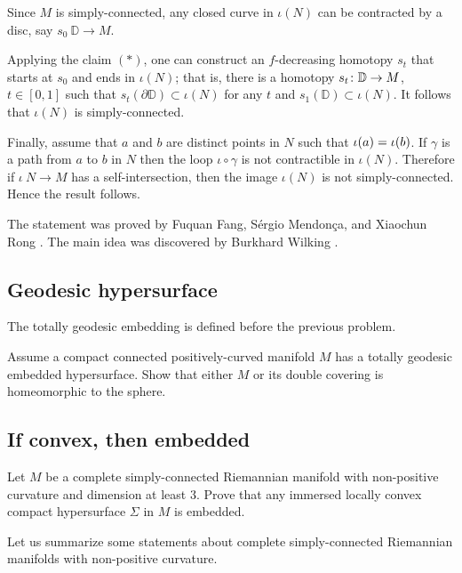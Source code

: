 Since $M$ is simply-connected,
any closed curve in $\iota(N)$
can be contracted by a disc, say $s_0\:\mathbb D\to M$.

Applying the claim $({*})$, one can construct an $f$-decreasing homotopy $s_t$ that starts at $s_0$ and ends in $\iota(N)$;
that is, there is 
a homotopy $s_t\:\mathbb D\z\to M$, $t\in [0,1]$ 
such that $s_t(\partial \mathbb D)\subset \iota(N)$ for any $t$ 
and $s_1(\mathbb D)\subset \iota(N)$.
It follows that $\iota(N)$ is simply-connected.

Finally, assume that $a$ and $b$ are distinct points in $N$ such that $\iota(a)\z=\iota(b)$.
If $\gamma$ is a path from $a$ to $b$ in $N$ then the loop $\iota\circ\gamma$ is not contractible in $\iota(N)$.
Therefore if $\iota\:N\to M$ has a self-intersection,
then the image
$\iota(N)$ is not simply-connected.
Hence the result follows.\qeds


The statement was proved by 
Fuquan Fang, 
S\'ergio Mendon\c{c}a,
and Xiaochun Rong \cite{FMR}.
The main idea was discovered by 
Burkhard Wilking \cite{wilking-2003}.

\subsection*{Geodesic hypersurface}
\label{Geodesic hypersurface}

The totally geodesic embedding is defined before the previous problem.

\begin{pr}
Assume a compact connected positively-curved manifold $M$ has a totally geodesic embedded hypersurface.
Show that either $M$ or its double covering is homeomorphic to the sphere.
\end{pr}

\subsection*{If convex, then embedded}
\label{If convex then embedded} 

\begin{pr}
Let $M$ be a complete simply-connected Riemannian manifold 
with non-positive curvature 
and dimension at least $3$.
Prove that any immersed locally convex
compact hypersurface $\Sigma$ in $M$ is embedded.
\end{pr}

Let us summarize some statements about complete simply-connected Riemannian manifolds 
with non-positive curvature.

